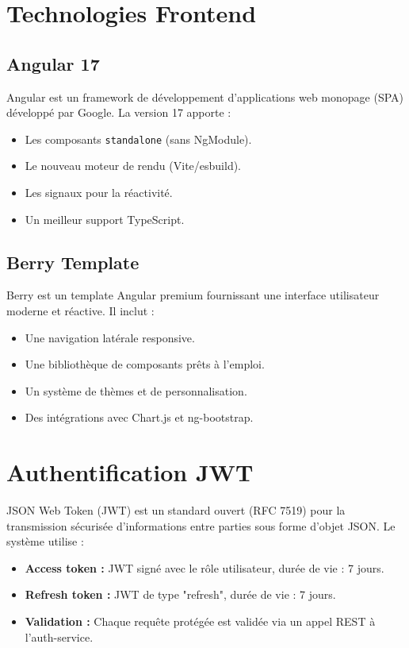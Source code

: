 \documentclass[12pt,a4paper,twoside]{report}
\begin{document}
\section{Technologies Frontend}

\subsection{Angular 17}
Angular est un framework de développement d'applications web monopage (SPA) développé par Google. La version 17 apporte :
\begin{itemize}[leftmargin=*]
  \item Les composants \texttt{standalone} (sans NgModule).
  \item Le nouveau moteur de rendu (Vite/esbuild).
  \item Les signaux pour la réactivité.
  \item Un meilleur support TypeScript.
\end{itemize}

\subsection{Berry Template}
Berry est un template Angular premium fournissant une interface utilisateur moderne et réactive. Il inclut :
\begin{itemize}[leftmargin=*]
  \item Une navigation latérale responsive.
  \item Une bibliothèque de composants prêts à l'emploi.
  \item Un système de thèmes et de personnalisation.
  \item Des intégrations avec Chart.js et ng-bootstrap.
\end{itemize}

\section{Authentification JWT}
JSON Web Token (JWT) est un standard ouvert (RFC 7519) pour la transmission sécurisée d'informations entre parties sous forme d'objet JSON. Le système utilise :
\begin{itemize}[leftmargin=*]
  \item \textbf{Access token :} JWT signé avec le rôle utilisateur, durée de vie : 7 jours.
  \item \textbf{Refresh token :} JWT de type "refresh", durée de vie : 7 jours.
  \item \textbf{Validation :} Chaque requête protégée est validée via un appel REST à l'auth-service.
\end{itemize}
\end{document}

